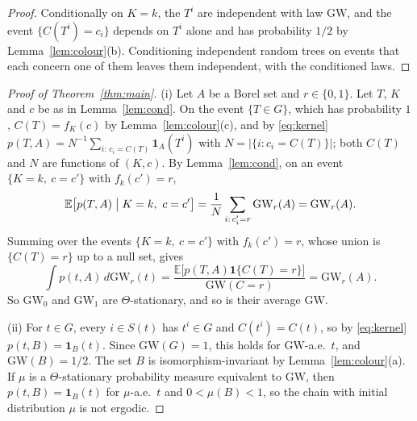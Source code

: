 \documentclass[11pt]{amsart}
\theoremstyle{remark}
\numberwithin{equation}{section}
\newcommand{\E}{\mathbb E}
\newcommand{\GW}{\mathrm{GW}}
\newcommand{\one}{\mathbf 1}
\begin{document}
\begin{proof}
Conditionally on $K=k$, the $T^i$ are independent with law $\GW$, and the event $\{C(T^i)=c_i\}$ depends on $T^i$ alone and has probability $1/2$ by Lemma~\ref{lem:colour}(b). Conditioning independent random trees on events that each concern one of them leaves them independent, with the conditioned laws.
\end{proof}

\begin{proof}[Proof of Theorem~\ref{thm:main}]
(i) Let $A$ be a Borel set and $r\in\{0,1\}$. Let $T$, $K$ and $c$ be as in Lemma~\ref{lem:cond}. On the event $\{T\in G\}$, which has probability $1$, $C(T)=f_K(c)$ by Lemma~\ref{lem:colour}(c), and by \eqref{eq:kernel} $p(T,A)=N^{-1}\sum_{i:\,c_i=C(T)}\one_A(T^i)$ with $N=|\{i:c_i=C(T)\}|$; both $C(T)$ and $N$ are functions of $(K,c)$. By Lemma~\ref{lem:cond}, on an event $\{K=k,\ c=c'\}$ with $f_k(c')=r$,
\[
\E\bigl[p(T,A)\bigm|K=k,\ c=c'\bigr]=\frac1N\sum_{i:\,c'_i=r}\GW_r(A)=\GW_r(A).
\]
Summing over the events $\{K=k,\ c=c'\}$ with $f_k(c')=r$, whose union is $\{C(T)=r\}$ up to a null set, gives
\begin{equation}\label{eq:statr}
\int p(t,A)\,d\GW_r(t)=\frac{\E\bigl[p(T,A)\one\{C(T)=r\}\bigr]}{\GW(C=r)}=\GW_r(A).
\end{equation}
So $\GW_0$ and $\GW_1$ are $\Theta$-stationary, and so is their average $\GW$.

(ii) For $t\in G$, every $i\in S(t)$ has $t^i\in G$ and $C(t^i)=C(t)$, so by \eqref{eq:kernel} $p(t,B)=\one_B(t)$. Since $\GW(G)=1$, this holds for $\GW$-a.e.\ $t$, and $\GW(B)=1/2$. The set $B$ is isomorphism-invariant by Lemma~\ref{lem:colour}(a). If $\mu$ is a $\Theta$-stationary probability measure equivalent to $\GW$, then $p(t,B)=\one_B(t)$ for $\mu$-a.e.\ $t$ and $0<\mu(B)<1$, so the chain with initial distribution $\mu$ is not ergodic.


\end{proof}
\end{document}
